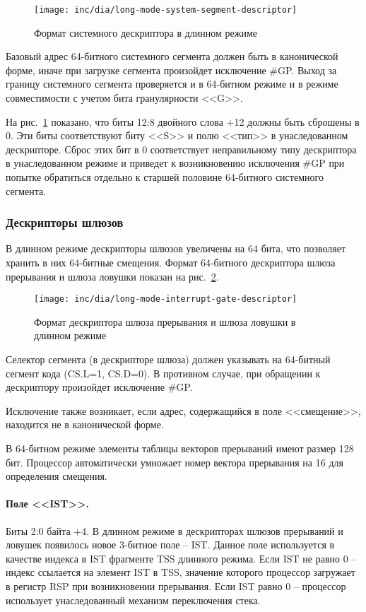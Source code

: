 \begin{figure}[ht!]
  \centering
  \texttt{[image: inc/dia/long-mode-system-segment-descriptor]}
  \caption{Формат системного дескриптора в длинном режиме}
  \label{fig:long-mode-system-segment-descriptor-format}
\end{figure}

Базовый адрес 64-битного системного сегмента должен быть в канонической форме, иначе при
загрузке сегмента произойдет исключение \#GP. Выход за границу системного сегмента проверяется и
в 64-битном режиме и в режиме совместимости с учетом бита гранулярности <<G>>.

На рис.~\ref{fig:long-mode-system-segment-descriptor-format} показано, что биты 12:8 двойного слова +12
должны быть сброшены в 0. Эти биты соответствуют биту <<S>> и полю <<тип>> в унаследованном дескрипторе.
Сброс этих бит в 0 соответствует неправильному типу дескриптора в унаследованном режиме и приведет
к возникновению исключения \#GP при попытке обратиться отдельно к старшей половине 64-битного системного сегмента.

\subsubsection*{Дескрипторы шлюзов}
В длинном режиме дескрипторы шлюзов увеличены на 64 бита, что позволяет хранить в них 64-битные смещения.
Формат 64-битного дескриптора шлюза прерывания и шлюза ловушки показан на рис.~\ref{fig:long-mode-interrupt-gate-descriptor}.

\begin{figure}[ht!]
  \centering
  \texttt{[image: inc/dia/long-mode-interrupt-gate-descriptor]}
  \caption{Формат дескриптора шлюза прерывания и шлюза ловушки в длинном режиме}
  \label{fig:long-mode-interrupt-gate-descriptor}
\end{figure}

Селектор сегмента (в дескрипторе шлюза) должен указывать на 64-битный сегмент кода (CS.L=1, CS.D=0).
В противном случае, при обращении к дескриптору произойдет исключение \#GP.

Исключение также возникает, если адрес, содержащийся в поле <<смещение>>, находится не в канонической форме.

В 64-битном режиме элементы таблицы векторов прерываний имеют размер 128 бит. Процессор автоматически
умножает номер вектора прерывания на 16 для определения смещения.

\paragraph{Поле <<IST>>.} Биты 2:0 байта +4. В длинном режиме в дескрипторах шлюзов прерываний и ловушек
появилось новое 3-битное поле -- IST. Данное поле используется в качестве индекса в IST фрагменте TSS длинного режима.
Если IST не равно 0 -- индекс ссылается на элемент IST в TSS, значение которого процессор загружает в регистр RSP при
возникновении прерывания. Если IST равно 0 -- процессор использует унаследованный механизм переключения стека.

